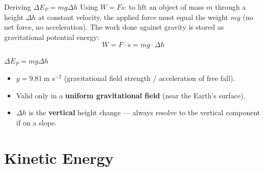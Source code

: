\begin{formulabox}{Deriving \texorpdfstring{$\Delta E_P = mg\Delta h$}{ΔEp = mgΔh}}
Using $W = Fs$: to lift an object of mass $m$ through a height $\Delta h$ at constant velocity, the applied force must equal the weight $mg$ (no net force, no acceleration). The work done against gravity is stored as gravitational potential energy:
$$W = F \cdot s = mg \cdot \Delta h$$
\begin{center}
\Large $\Delta E_P = mg\Delta h$
\end{center}
\begin{itemize}[itemsep=2pt]
  \item $g = 9.81\ \text{m s}^{-2}$ (gravitational field strength / acceleration of free fall).
  \item Valid only in a \textbf{uniform gravitational field} (near the Earth's surface).
  \item $\Delta h$ is the \textbf{vertical} height change — always resolve to the vertical component if on a slope.
\end{itemize}
\end{formulabox}

\begin{center}
\end{center}

\pagebreak

\section{Kinetic Energy}

